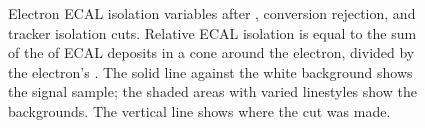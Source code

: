 \begin{figure}[htb]
  \begin{center}
  \end{center}
  \caption[\fixspacing Electron ECAL isolation variables after \Et, conversion rejection, and tracker isolation cuts]{
  \fixspacing Electron ECAL isolation variables after \Et, 
  conversion rejection, and tracker isolation cuts.
  Relative ECAL isolation is equal to the sum of the \Et of ECAL deposits 
  in a cone around the electron, divided by the electron's \pt.
  The solid line against the white background shows the signal sample;
  the shaded areas with varied linestyles show the backgrounds.
  The vertical line shows where the cut was made.
  } 
  \label{fig:ecalElecIsoVars}
 \end{figure}



